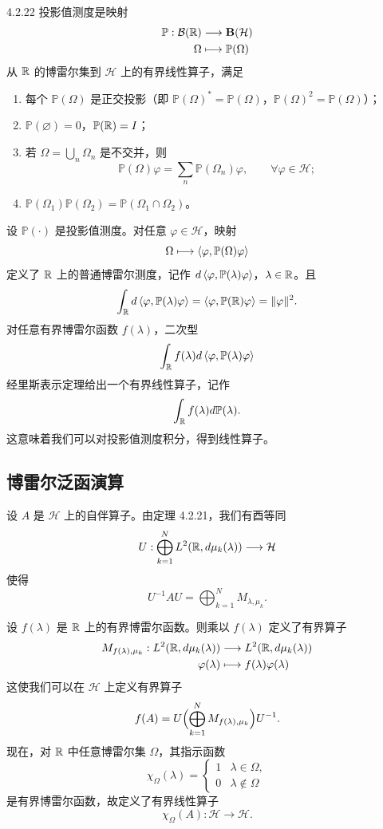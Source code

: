 \begin{definition}{4.2.22}
  投影值测度是映射
  \[
  \begin{aligned}
  \mathbb{P}:\mathcal{B}(\mathbb{R})&\longrightarrow\mathbf{B}(\mathcal{H})\\
  \Omega&\longmapsto\mathbb{P}(\Omega)
  \end{aligned}
  \]
  从 $\mathbb{R}$ 的博雷尔集到 $\mathcal{H}$ 上的有界线性算子，满足
  \begin{enumerate}[label=\textcircled{\small\arabic*},leftmargin=2.6em,itemsep=2pt]
    \item 每个 $\mathbb{P}(\Omega)$ 是正交投影（即 $\mathbb{P}(\Omega)^*=\mathbb{P}(\Omega)$，$\mathbb{P}(\Omega)^2=\mathbb{P}(\Omega)$）；
    \item $\mathbb{P}(\varnothing)=0$，$\mathbb{P}(\mathbb{R})=I$；
    \item 若 $\Omega=\bigcup_n\Omega_n$ 是不交并，则
    \[
    \mathbb{P}(\Omega)\varphi=\sum_n\mathbb{P}(\Omega_n)\varphi,\qquad\forall\varphi\in\mathcal{H};
    \]
    \item $\mathbb{P}(\Omega_1)\mathbb{P}(\Omega_2)=\mathbb{P}(\Omega_1\cap\Omega_2)$。
  \end{enumerate}
\end{definition}

设 $\mathbb{P}(\cdot)$ 是投影值测度。对任意 $\varphi\in\mathcal{H}$，映射
\[
\Omega\longmapsto\left\langle \varphi,\mathbb{P}(\Omega)\varphi\right\rangle
\]
定义了 $\mathbb{R}$ 上的普通博雷尔测度，记作 $d\left\langle \varphi,\mathbb{P}(\lambda)\varphi\right\rangle$，$\lambda\in\mathbb{R}$。且
\[
\int_{\mathbb{R}}d\left\langle \varphi,\mathbb{P}(\lambda)\varphi\right\rangle
=\left\langle \varphi,\mathbb{P}(\mathbb{R})\varphi\right\rangle=\lVert \varphi\rVert^2.
\]
对任意有界博雷尔函数 $f(\lambda)$，二次型
\[
\int_{\mathbb{R}} f(\lambda)d\left\langle \varphi,\mathbb{P}(\lambda)\varphi\right\rangle
\]
经里斯表示定理给出一个有界线性算子，记作
\[
\int_{\mathbb{R}} f(\lambda)d\mathbb{P}(\lambda).
\]
这意味着我们可以对投影值测度积分，得到线性算子。

\subsection{博雷尔泛函演算}

设 $A$ 是 $\mathcal{H}$ 上的自伴算子。由定理 4.2.21，我们有酉等同
\[
U:\bigoplus_{k=1}^{N}L^2(\mathbb{R},d\mu_k(\lambda))\longrightarrow\mathcal{H}
\]
使得
\[
U^{-1}AU=\bigoplus_{k=1}^{N}M_{\lambda,\mu_k}.
\]

设 $f(\lambda)$ 是 $\mathbb{R}$ 上的有界博雷尔函数。则乘以 $f(\lambda)$ 定义了有界算子
\[
\begin{aligned}
M_{f(\lambda),\mu_k}:L^2(\mathbb{R},d\mu_k(\lambda))&\longrightarrow L^2(\mathbb{R},d\mu_k(\lambda))\\
\varphi(\lambda)&\longmapsto f(\lambda)\varphi(\lambda)
\end{aligned}
\]
这使我们可以在 $\mathcal{H}$ 上定义有界算子
\[
f(A)=U\Bigl(\bigoplus_{k=1}^{N}M_{f(\lambda),\mu_k}\Bigr)U^{-1}.
\]
现在，对 $\mathbb{R}$ 中任意博雷尔集 $\Omega$，其指示函数
\[
\chi_\Omega(\lambda)=\begin{cases}1&\lambda\in\Omega,\\ 0&\lambda\notin\Omega\end{cases}
\]
是有界博雷尔函数，故定义了有界线性算子
\[
\chi_\Omega(A):\mathcal{H}\longrightarrow\mathcal{H}.
\]


